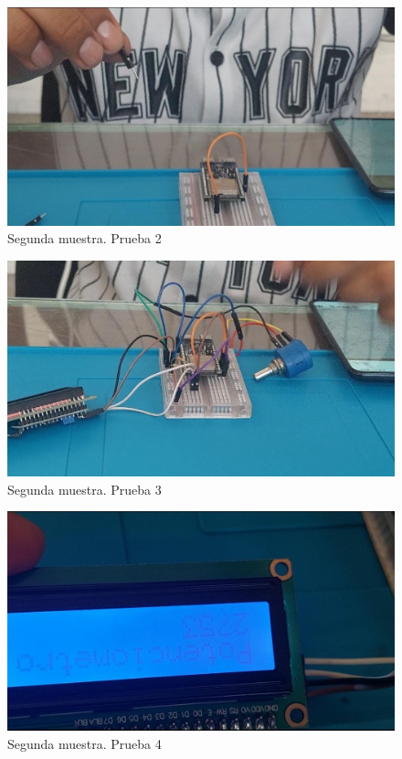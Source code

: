 \begin{figure}[H]
        \centering
        \includegraphics[trim = {0mm 0mm 0mm 0mm},clip,scale=0.2]{10/Img/muestra2Prueba2.jpg}
        \caption{Segunda muestra. Prueba 2}
        \label{Prueba 2.2}
    \end{figure}

\begin{figure}[H]
        \centering
        \includegraphics[trim = {30mm 30mm 30mm 30mm},clip,scale=0.2]{10/Img/muestra2Prueba3.jpg}
        \caption{Segunda muestra. Prueba 3}
        \label{Prueba 2.3}
    \end{figure}

\begin{figure}[H]
        \centering
        \includegraphics[trim = {30mm 30mm 30mm 30mm},clip,scale=0.2]{10/Img/muestra2Prueba4.jpg}
        \caption{Segunda muestra. Prueba 4}
        \label{Prueba 2.4}
    \end{figure}

